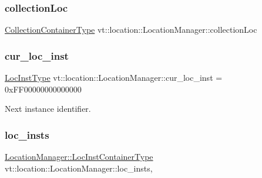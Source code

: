 \subsubsection{\texorpdfstring{collection\+Loc}{collectionLoc}}
{\footnotesize\ttfamily \hyperlink{structvt_1_1location_1_1_location_manager_a03472723aecf57cd99cd221ef2164edb}{Collection\+Container\+Type} vt\+::location\+::\+Location\+Manager\+::collection\+Loc\hspace{0.3cm}{\ttfamily [protected]}}

\mbox{\label{structvt_1_1location_1_1_location_manager_a644b4b030fd616375728316281295250}} 
\subsubsection{\texorpdfstring{cur\+\_\+loc\+\_\+inst}{cur\_loc\_inst}}
{\footnotesize\ttfamily \hyperlink{namespacevt_1_1location_a4db6456e8024af2d23fc5ae560fef866}{Loc\+Inst\+Type} vt\+::location\+::\+Location\+Manager\+::cur\+\_\+loc\+\_\+inst = 0x\+F\+F00000000000000\hspace{0.3cm}{\ttfamily [static]}}



Next instance identifier. 

\mbox{\label{structvt_1_1location_1_1_location_manager_ae1f3b1c4bf75a14fce51a284bd692fe3}} 
\subsubsection{\texorpdfstring{loc\+\_\+insts}{loc\_insts}}
{\footnotesize\ttfamily \hyperlink{structvt_1_1location_1_1_location_manager_adf4df6480ad89271a802d6d59bcf424e}{Location\+Manager\+::\+Loc\+Inst\+Container\+Type} vt\+::location\+::\+Location\+Manager\+::loc\+\_\+insts\hspace{0.3cm}{\ttfamily [static]}, {\ttfamily [private]}}

